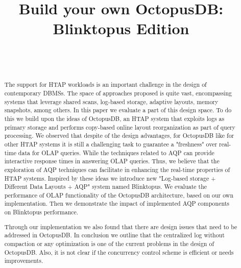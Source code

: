 \documentclass[10pt, conference, compsocconf]{IEEEtran}
\begin{document}
\title{Build your own OctopusDB: Blinktopus Edition}
\author{ \\  \\ }

\author{
}

\maketitle

\begin{abstract}
The support for HTAP workloads is an important challenge in the design of contemporary DBMSs. The space of approaches proposed is quite vast, encompassing systems that leverage shared scans, log-based storage, adaptive layouts, memory snapshots, among others. In this paper we evaluate a part of this design space. To do this we build upon the ideas of OctopusDB, an HTAP system that exploits logs as primary storage and performs copy-based online layout reorganization as part of query processing. We observed that despite of the design advantages, for OctopusDB like for other HTAP systems it is still a challenging task to guarantee a "freshness" over real-time data for OLAP queries. While the techniques related to AQP can provide interactive response times in answering OLAP queries. Thus, we believe that the exploration of AQP  techniques can facilitate in enhancing the real-time properties of HTAP systems. Inspired by these ideas we introduce new "Log-based storage + Different Data Layouts + AQP" system named Blinktopus\footnotemark. We evaluate the performance of OLAP functionality of the OctopusDB architecture, based on our own implementation. Then we demonstrate the impact of implemented AQP components on Blinktopus performance.

Through our implementation we also found that there are design issues that need to be addressed in OctopusDB. In conclusion we outline that the centralized log without compaction or any optimization is one of the current problems in the design of OctopusDB. Also, it is not clear if the concurrency control scheme is efficient or needs improvements.

\end{abstract}
\end{document}
